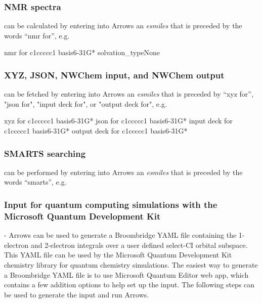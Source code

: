 \documentclass[runningheads,a4paper]{llncs}
\begin{document}

\subsubsection{NMR spectra} can be calculated by entering into Arrows an \textit{esmiles} that is preceded by the words “nmr for”, e.g.
\begin{center}
\begin{boxedverbatim}
nmr for c1ccccc1 basis{6-31G*} solvation_type{None}  
\end{boxedverbatim}
\end{center}
\subsubsection{XYZ, JSON, NWChem input, and NWChem output} can be fetched by entering into Arrows an \textit{esmiles} that is preceded by  “xyz for”, "json for", "input deck for", or "output deck for", e.g.
\begin{center}
\begin{boxedverbatim}
xyz for c1ccccc1 basis{6-31G*} 
json for c1ccccc1 basis{6-31G*}
input deck for c1ccccc1 basis{6-31G*}
output deck for c1ccccc1 basis{6-31G*} 
\end{boxedverbatim}
\end{center}
\subsubsection{SMARTS searching} can be performed by entering into Arrows an \textit{esmiles} that is preceded by the words “smarts”, e.g.
\begin{center}
\end{center}
\subsubsection{Input for quantum computing simulations with the Microsoft Quantum Development Kit} - Arrows can be used to generate a Broombridge YAML file containing the 1-electron and 2-electron integrals over a user defined select-CI orbital subspace. This YAML file can be used by the Microsoft Quantum Development Kit chemistry library for quantum chemistry simulations.   The easiest way to generate a Broombridge YAML file is to use Microsoft Quantum Editor web app, which contains a few addition options to help set up the input. The following steps can be used to generate the input and run Arrows.
\end{document}

